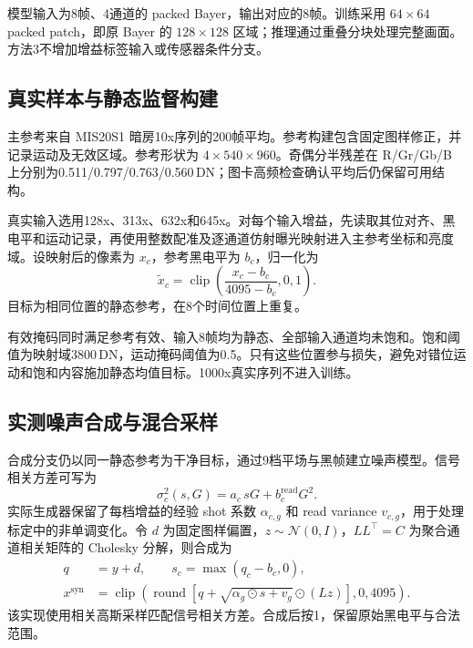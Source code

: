 \documentclass[11pt,a4paper,UTF8,fontset=fandol]{ctexart}
\newcommand{\dn}{\ensuremath{\,\mathrm{DN}}}
\begin{document}
模型输入为8帧、4通道的 packed Bayer，输出对应的8帧。训练采用 $64\times64$ packed patch，即原 Bayer 的 $128\times128$ 区域；推理通过重叠分块处理完整画面。方法3不增加增益标签输入或传感器条件分支。

\subsection{真实样本与静态监督构建}

主参考来自 MIS20S1 暗房10x序列的200帧平均。参考构建包含固定图样修正，并记录运动及无效区域。参考形状为 $4\times540\times960$。奇偶分半残差在 R/Gr/Gb/B 上分别为0.511/0.797/0.763/0.560\dn；图卡高频检查确认平均后仍保留可用结构。

真实输入选用128x、313x、632x和645x。对每个输入增益，先读取其位对齐、黑电平和运动记录，再使用整数配准及逐通道仿射曝光映射进入主参考坐标和亮度域。设映射后的像素为 $x_c$，参考黑电平为 $b_c$，归一化为
\begin{equation}
 \widetilde{x}_c=\operatorname{clip}\left(\frac{x_c-b_c}{4095-b_c},0,1\right).
 \label{eq:normalization}
\end{equation}
目标为相同位置的静态参考，在8个时间位置上重复。

有效掩码同时满足参考有效、输入8帧均为静态、全部输入通道均未饱和。饱和阈值为映射域3800\dn，运动掩码阈值为0.5。只有这些位置参与损失，避免对错位运动和饱和内容施加静态均值目标。1000x真实序列不进入训练。

\subsection{实测噪声合成与混合采样}

合成分支仍以同一静态参考为干净目标，通过9档平场与黑帧建立噪声模型。信号相关方差可写为
\begin{equation}
 \sigma_c^2(s,G)=a_c\,sG+b_c^{\mathrm{read}}G^2.
\end{equation}
实际生成器保留了每档增益的经验 shot 系数 $\alpha_{c,g}$ 和 read variance $v_{c,g}$，用于处理标定中的非单调变化。令 $d$ 为固定图样偏置，$z\sim\mathcal N(0,I)$，$LL^\top=C$ 为聚合通道相关矩阵的 Cholesky 分解，则合成为
\begin{align}
 q &= y+d,\qquad s_c=\max(q_c-b_c,0),\\
 x^{\mathrm{syn}} &= \operatorname{clip}\left(
 \operatorname{round}\left[q+\sqrt{\alpha_g\odot s+v_g}\odot(Lz)\right],0,4095\right).
 \label{eq:synthetic}
\end{align}
该实现使用相关高斯采样匹配信号相关方差。合成后按1，保留原始黑电平与合法范围。
\end{document}
